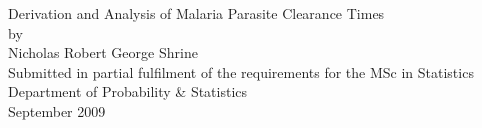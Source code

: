 \documentclass[a4paper,12pt,openright,twoside,doublespace]{book}
\begin{document}
\begin{titlepage}
\vspace*{\fill}
\begin{center}
{\huge Derivation and Analysis of Malaria Parasite Clearance Times}\\[1cm]
by\\[1cm]
{\large Nicholas Robert George Shrine}\\[4cm]
Submitted in partial fulfilment of the requirements for the MSc in Statistics\\
Department of Probability \& Statistics\\[2cm]
September 2009
\end{center}
\vspace*{\fill}
\end{titlepage}

\frontmatter
\tableofcontents
\listoffigures 

\mainmatter







\backmatter
 
{\singlespace}

\end{document}
